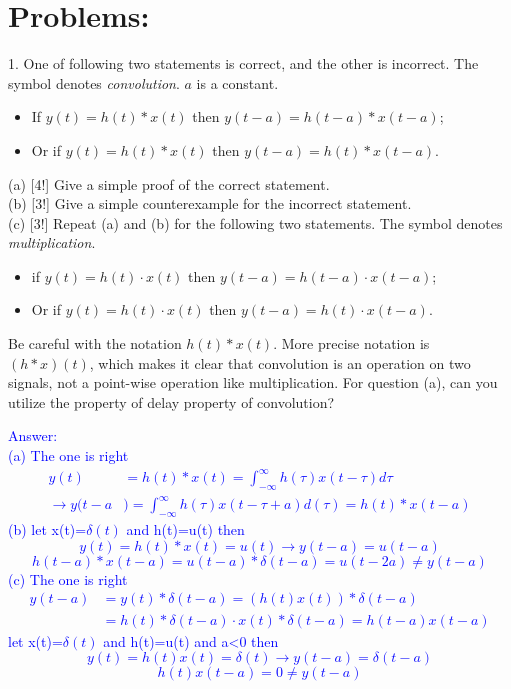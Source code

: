 \documentclass[12pt,a4paper]{article}
\begin{document}
\section*{Problems:}
\normalsize
\begin{tcolorbox}[colback = white]
1. One of following two statements is correct, and the other is incorrect. The symbol \fbox{*} denotes \textit{convolution}. $a$ is a constant.
\begin{itemize}
    \item 
    If $y(t)=h(t)*x(t)$ then $y(t-a)=h(t-a)*x(t-a)$;
    \item
    Or if $y(t)=h(t)*x(t)$ then $y(t-a)=h(t)*x(t-a)$.
\end{itemize}
(a) [4!] Give a simple proof of the correct statement.\\
(b) [3!] Give a simple counterexample for the incorrect statement.\\
(c) [3!] Repeat (a) and (b) for the following two statements. The symbol \fbox{$\cdot$} denotes \textit{multiplication}.
 
\begin{itemize}
    \item if $y(t)=h(t)\cdot x(t) $ then $y(t-a)=h(t-a)\cdot x(t-a)$;
    \item
    Or if $y(t)=h(t)\cdot x(t)$ then $y(t-a)=h(t)\cdot x(t-a)$.
\end{itemize}
Be careful with the notation $h(t)*x(t)$. More precise notation is $(h*x)(t)$, which makes it clear that convolution is an operation on two signals, not a point-wise operation like multiplication. For question (a), can you utilize the property of delay property of convolution?

\end{tcolorbox}

\begin{tcolorbox}
\normalsize
\textcolor{blue}{Answer:\\
(a) The  one is right 
$$\begin{aligned}
    y(t)&=h(t)*x(t)=\int_{-\infty}^\infty h(\tau)x(t-\tau)d\tau\\\rightarrow y(t-a&)=\int_{-\infty}^\infty h(\tau)x(t-\tau+a)d(\tau)=h(t)*x(t-a)
\end{aligned}$$
(b) let x(t)=$\delta(t)$ and h(t)=u(t) then
$$y(t)=h(t)*x(t)=u(t)\rightarrow y(t-a)=u(t-a)$$
$$h(t-a)*x(t-a)=u(t-a)*\delta(t-a)=u(t-2a)\neq y(t-a)$$
(c) The  one is right
$$
\begin{aligned}
    y(t-a)&=y(t)*\delta(t-a)=(h(t)x(t))*\delta(t-a)\\
    &=h(t)*\delta(t-a)\cdot x(t)*\delta(t-a)=h(t-a)x(t-a)
\end{aligned}
$$
let x(t)=$\delta(t)$ and h(t)=u(t) and a<0 then
$$y(t)=h(t)x(t)=\delta(t)\rightarrow y(t-a)=\delta(t-a)$$
$$h(t)x(t-a)=0 \neq y(t-a)$$
}
\end{tcolorbox}
\end{document}
